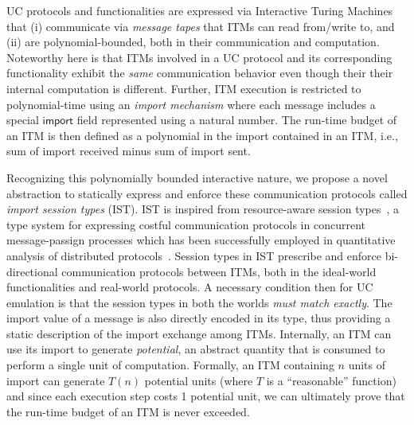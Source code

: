 UC protocols and functionalities are expressed via Interactive Turing Machines that (i) communicate via \emph{message tapes} that ITMs can read from/write to,
and (ii) are polynomial-bounded, both in their communication and computation.
Noteworthy here is that ITMs involved in a UC protocol and its corresponding functionality exhibit the \emph{same} communication behavior even though their
their internal computation is different.
Further, ITM execution is restricted to polynomial-time using an \emph{import mechanism} where each message includes a special $\mathsf{import}$
field represented using a natural number.
The run-time budget of an ITM is then defined as a polynomial in the import contained in an ITM, i.e., sum of import received minus
sum of import sent.

Recognizing this polynomially bounded interactive nature, we propose a novel abstraction to statically express and enforce these
communication protocols called \emph{import session types} (IST).
IST is inspired from resource-aware session types~\cite{das2018work}, a type system for expressing costful communication protocols
in concurrent message-passign processes which has been successfully employed in quantitative analysis of distributed
protocols~\cite{dasnomos,Das20FSCD,Das22LMCS,Das20arxiv}.
Session types in IST prescribe and enforce bi-directional communication protocols between ITMs, both in the ideal-world functionalities and real-world protocols.
A necessary condition then for UC emulation is that the session types in both the worlds \emph{must match exactly}.
The import value of a message is also directly encoded in its type, thus providing a static description of the import exchange
among ITMs.
Internally, an ITM can use its import to generate \emph{potential}, an abstract quantity that is consumed to perform a single
unit of computation.
Formally, an ITM containing $n$ units of import can generate $T(n)$ potential units (where $T$ is a ``reasonable'' function)
and since each execution step costs 1 potential unit, we can ultimately prove that the run-time budget of an ITM is never exceeded.


